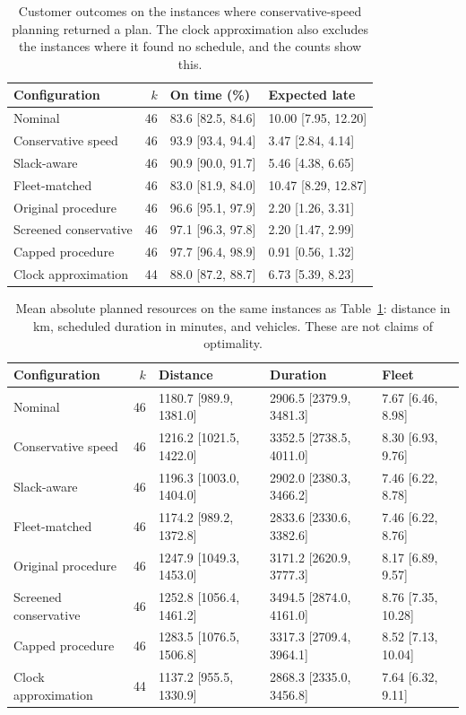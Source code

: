 \begin{table}[H]
\centering
\small
\caption{Customer outcomes on the instances where conservative-speed planning returned a plan. The clock approximation also excludes the instances where it found no schedule, and the counts show this.}
\label{tab:customers}
\begin{tabular}{lrll}
\toprule
Configuration & $k$ & On time (\%) & Expected late\\
\midrule
Nominal & 46 & 83.6 [82.5, 84.6] & 10.00 [7.95, 12.20]\\
Conservative speed & 46 & 93.9 [93.4, 94.4] & 3.47 [2.84, 4.14]\\
Slack-aware & 46 & 90.9 [90.0, 91.7] & 5.46 [4.38, 6.65]\\
Fleet-matched & 46 & 83.0 [81.9, 84.0] & 10.47 [8.29, 12.87]\\
Original procedure & 46 & 96.6 [95.1, 97.9] & 2.20 [1.26, 3.31]\\
Screened conservative & 46 & 97.1 [96.3, 97.8] & 2.20 [1.47, 2.99]\\
Capped procedure & 46 & 97.7 [96.4, 98.9] & 0.91 [0.56, 1.32]\\
Clock approximation & 44 & 88.0 [87.2, 88.7] & 6.73 [5.39, 8.23]\\
\bottomrule
\end{tabular}
\end{table}


\begin{table}[H]
\centering
\scriptsize
\caption{Mean absolute planned resources on the same instances as Table~\ref{tab:customers}: distance in km, scheduled duration in minutes, and vehicles. These are not claims of optimality.}
\label{tab:fullcost}
\begin{tabular}{lrlll}
\toprule
Configuration & $k$ & Distance & Duration & Fleet\\
\midrule
Nominal & 46 & 1180.7 [989.9, 1381.0] & 2906.5 [2379.9, 3481.3] & 7.67 [6.46, 8.98]\\
Conservative speed & 46 & 1216.2 [1021.5, 1422.0] & 3352.5 [2738.5, 4011.0] & 8.30 [6.93, 9.76]\\
Slack-aware & 46 & 1196.3 [1003.0, 1404.0] & 2902.0 [2380.3, 3466.2] & 7.46 [6.22, 8.78]\\
Fleet-matched & 46 & 1174.2 [989.2, 1372.8] & 2833.6 [2330.6, 3382.6] & 7.46 [6.22, 8.76]\\
Original procedure & 46 & 1247.9 [1049.3, 1453.0] & 3171.2 [2620.9, 3777.3] & 8.17 [6.89, 9.57]\\
Screened conservative & 46 & 1252.8 [1056.4, 1461.2] & 3494.5 [2874.0, 4161.0] & 8.76 [7.35, 10.28]\\
Capped procedure & 46 & 1283.5 [1076.5, 1506.8] & 3317.3 [2709.4, 3964.1] & 8.52 [7.13, 10.04]\\
Clock approximation & 44 & 1137.2 [955.5, 1330.9] & 2868.3 [2335.0, 3456.8] & 7.64 [6.32, 9.11]\\
\bottomrule
\end{tabular}
\end{table}


